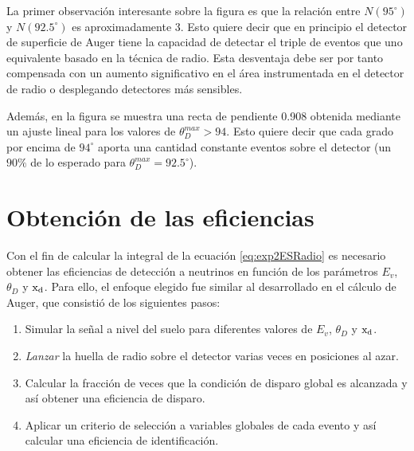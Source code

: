 	La primer observaci\'on interesante sobre la figura es que la relaci\'on entre $N(95^\circ)$ y $N(92.5^\circ)$ es aproximadamente 3.
	Esto quiere decir que en principio el detector de superficie de Auger tiene la capacidad de detectar el triple de eventos que uno equivalente basado en la t\'ecnica de radio.
	Esta desventaja debe ser por tanto compensada con un aumento significativo en el \'area instrumentada en el detector de radio o desplegando detectores m\'as sensibles.
	
	Adem\'as, en la figura se muestra una recta de pendiente 0.908 obtenida mediante un ajuste lineal para los valores de $\theta_D^{max}>94$.
	Esto quiere decir que cada grado por encima de $94^\circ$ aporta una cantidad constante eventos sobre el detector (un $90\%$ de lo esperado para $\theta_D^{max}=92.5^\circ$).
	
\section{Obtenci\'on de las eficiencias}
\label{sc:effRadio}

Con el fin de calcular la integral de la ecuaci\'on \ref{eq:exp2ESRadio} es necesario obtener las eficiencias de detecci\'on a neutrinos en funci\'on de los par\'ametros $E_v$, $\theta_D$ y ${\rm x_d}$. 
Para ello, el enfoque elegido fue similar al desarrollado en el c\'alculo de Auger, que consisti\'o de los siguientes pasos:
%
\begin{enumerate}
	\item Simular la se\~nal a nivel del suelo para diferentes valores de $E_v$, $\theta_D$ y ${\rm x_d}$.
	\item \emph{Lanzar} la huella de radio sobre el detector varias veces en posiciones al azar.
	\item Calcular la fracci\'on de veces que la condici\'on de disparo global es alcanzada y as\'i obtener una eficiencia de disparo.
	\item Aplicar un criterio de selecci\'on a variables globales de cada evento y as\'i calcular una eficiencia de identificaci\'on.
\end{enumerate}
%

